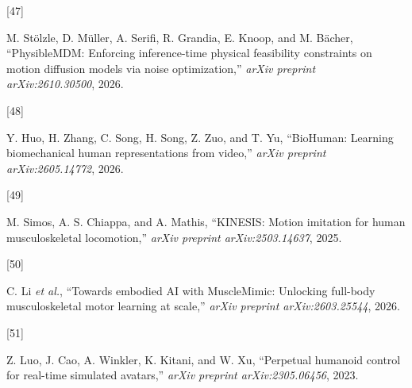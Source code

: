 \documentclass[
  11pt,
]{article}
\newlength{\cslhangindent}
\newlength{\csllabelwidth}
\newenvironment{CSLReferences}[2] %
 {\begin{list}{}{%
  \setlength{\itemindent}{0pt}
  \setlength{\leftmargin}{0pt}
  \setlength{\parsep}{0pt}
  \ifodd #1
   \setlength{\leftmargin}{\cslhangindent}
   \setlength{\itemindent}{-1\cslhangindent}
  \fi
  \setlength{\itemsep}{#2\baselineskip}}}
 {\end{list}}
\newcommand{\CSLLeftMargin}[1]{\parbox[t]{\csllabelwidth}{\strut#1\strut}}
\newcommand{\CSLRightInline}[1]{\parbox[t]{\linewidth - \csllabelwidth}{\strut#1\strut}}
\begin{document}
\begin{CSLReferences}{0}{0}
\CSLLeftMargin{{[}47{]} }%
\CSLRightInline{M. Stölzle, D. Müller, A. Serifi, R. Grandia, E. Knoop,
and M. Bächer, {``{PhysibleMDM}: Enforcing inference-time physical
feasibility constraints on motion diffusion models via noise
optimization,''} \emph{arXiv preprint arXiv:2610.30500}, 2026.}

\CSLLeftMargin{{[}48{]} }%
\CSLRightInline{Y. Huo, H. Zhang, C. Song, H. Song, Z. Zuo, and T. Yu,
{``{BioHuman}: Learning biomechanical human representations from
video,''} \emph{arXiv preprint arXiv:2605.14772}, 2026.}

\CSLLeftMargin{{[}49{]} }%
\CSLRightInline{M. Simos, A. S. Chiappa, and A. Mathis, {``{KINESIS}:
Motion imitation for human musculoskeletal locomotion,''} \emph{arXiv
preprint arXiv:2503.14637}, 2025.}

\CSLLeftMargin{{[}50{]} }%
\CSLRightInline{C. Li \emph{et al.}, {``Towards embodied {AI} with
{MuscleMimic}: Unlocking full-body musculoskeletal motor learning at
scale,''} \emph{arXiv preprint arXiv:2603.25544}, 2026.}

\CSLLeftMargin{{[}51{]} }%
\CSLRightInline{Z. Luo, J. Cao, A. Winkler, K. Kitani, and W. Xu,
{``Perpetual humanoid control for real-time simulated avatars,''}
\emph{arXiv preprint arXiv:2305.06456}, 2023.}

\end{CSLReferences}
\end{document}
